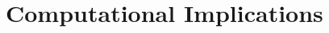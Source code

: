 \documentclass[10pt]{article}
\numberwithin{equation}{section}
\newcommand{\+}{%
	\raisebox{0.18ex}{\scaleobj{0.55}{+}}
}
\theoremstyle{definition}
\theoremstyle{definition}
\begin{document}
 
\section{Computational Implications}\label{sec:computational_imp}



\end{document}
